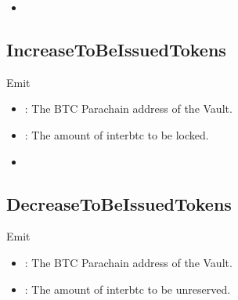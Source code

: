 \documentclass[a4paper,10pt,english]{sphinxmanual}
\begin{document}
\begin{itemize}
\item {} 
{\hyperref[\detokenize{spec/vault-registry:updatepublickey}]{}}

\end{itemize}


\subsection{IncreaseToBeIssuedTokens}
\label{\detokenize{spec/vault-registry:increasetobeissuedtokens}}
Emit



\begin{itemize}
\item {} 
: The BTC Parachain address of the Vault.

\item {} 
: The amount of interbtc to be locked.

\end{itemize}

\begin{itemize}
\item {} 
{\hyperref[\detokenize{spec/vault-registry:tryincreasetobeissuedtokens}]{}}

\end{itemize}


\subsection{DecreaseToBeIssuedTokens}
\label{\detokenize{spec/vault-registry:id44}}
Emit



\begin{itemize}
\item {} 
: The BTC Parachain address of the Vault.

\item {} 
: The amount of interbtc to be unreserved.

\end{itemize}
\end{document}
